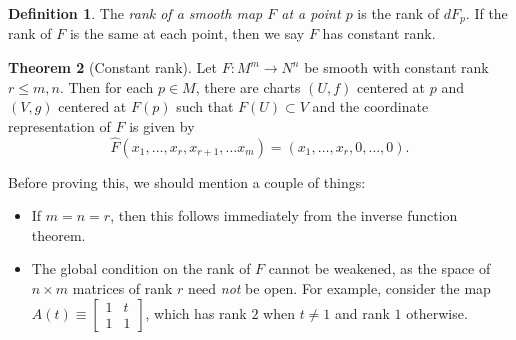 \documentclass[10pt,letterpaper,cm]{nupset}
\theoremstyle{definition}
\newtheorem{definition}{Definition}[subsection]
\theoremstyle{theorem}
\newtheorem{theorem}[definition]{Theorem}
\theoremstyle{remark}
\newcommand{\1}{\mathbf{1}}
\newcommand{\0}{\vec 0}
\begin{document}
\begin{definition}
The \textit{rank of a smooth map $F$ at a point $p$} is the rank of $dF_p$. If the rank of $F$ is the same at each point, then we say $F$ has constant rank.
\end{definition}

\begin{theorem}[Constant rank]
Let $F: M^m \to N^n$ be smooth with constant rank $r\leq m, n$. Then for each $p\in M$, there are charts $(U, f)$ centered at $p$ and $(V, g)$ centered at $F(p)$ such that $F(U) \subset V$ and the coordinate representation of $F$ is given by $$\widehat{F}(x_1, \ldots, x_r, x_{r+1}, \ldots x_m) = \left(x_1, \ldots, x_r, 0,\ldots, 0\right).$$
\end{theorem}

Before proving this, we should mention a couple of things:

\begin{itemize}
\item If $m=n =r$, then this follows immediately from the inverse function theorem. 
\item The global condition on the rank of $F$ cannot be weakened, as the space of $n\times m$ matrices of rank $r$ need \emph{not} be open. For example, consider the map $A(t) \equiv \begin{bmatrix} 1 & t \\ 1 & 1 \end{bmatrix}$, which has rank $2$ when $t\ne 1$ and rank $1$ otherwise.
\end{itemize}
\end{document}
